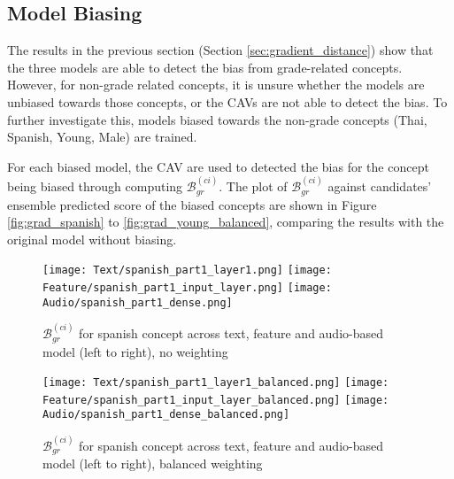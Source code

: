 \subsection{Model Biasing} \label{sec:model_biasing}
The results in the previous section (Section \ref{sec:gradient_distance}) show that the three models are able to detect the bias from grade-related concepts. However, for non-grade related concepts, it is unsure whether the models are unbiased towards those concepts, or the CAVs are not able to detect the bias. To further investigate this, models biased towards the non-grade concepts (Thai, Spanish, Young, Male) are trained.

For each biased model, the CAV are used to detected the bias for the concept being biased through computing $\mathcal{B}^{(ci)}_{gr}$. The plot of $\mathcal{B}^{(ci)}_{gr}$ against candidates’ ensemble predicted score of the biased concepts are shown in Figure \ref{fig:grad_spanish} to \ref{fig:grad_young_balanced}, comparing the results with the original model without biasing.

\begin{figure}[H]
    \centering
    \begin{minipage}[t]{0.48\textwidth}
        \centering
        \texttt{[image: Text/spanish\_part1\_layer1.png]}
        \hfill
        \texttt{[image: Feature/spanish\_part1\_input\_layer.png]}
        \texttt{[image: Audio/spanish\_part1\_dense.png]}
        \caption{$\mathcal{B}^{(ci)}_{gr}$ for spanish concept across text, feature and audio-based model (left to right), no weighting}
        \label{fig:grad_spanish}
    \end{minipage}
    \hfill
    \begin{minipage}[t]{0.48\textwidth}
        \centering
        \texttt{[image: Text/spanish\_part1\_layer1\_balanced.png]}
        \hfill
        \texttt{[image: Feature/spanish\_part1\_input\_layer\_balanced.png]}
        \texttt{[image: Audio/spanish\_part1\_dense\_balanced.png]}
        \caption{$\mathcal{B}^{(ci)}_{gr}$ for spanish concept across text, feature and audio-based model (left to right), balanced weighting}
        \label{fig:grad_spanish_balanced}
    \end{minipage}
\end{figure}

